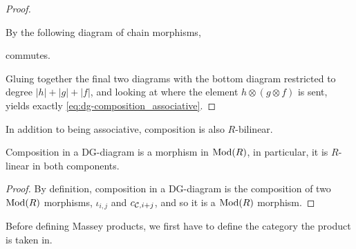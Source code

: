 \begin{proof}
\begin{center}
    \end{center}

    By \cite[Definition 6.2.1]{Borceux_1994} the following diagram of chain morphisms,
    \begin{center}
    \end{center}
    commutes.

    Gluing together the final two diagrams with the bottom diagram restricted to degree \( |h| + |g| + |f| \), and looking at where the element \( h \otimes (g \otimes f) \) is sent, yields exactly \autoref{eq:dg-composition_associative}.
\end{proof}

In addition to being associative, composition is also \( R \)-bilinear.

\begin{lemma}
    Composition in a DG-diagram is a morphism in \( \operatorname{Mod}(R) \), in particular, it is \( R \)-linear in both components.
\end{lemma}
\begin{proof}
    By definition, composition in a DG-diagram is the composition of two \( \operatorname{Mod}(R) \) morphisms, \( \iota_{i, j} \) and \( c_{{\mathcal{C}}, i + j} \), and so it is a \( \operatorname{Mod}(R) \) morphism.
\end{proof}

Before defining Massey products, we first have to define the category the product is taken in.

